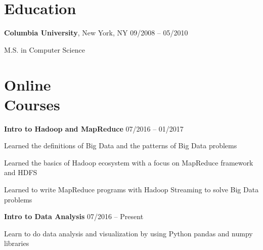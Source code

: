 \documentclass[margin,line]{resume}
\begin{document}
\begin{resume}
    \section{\myheadingstyle Education}

    \textbf{Columbia University}, New York, NY \hfill 09/2008 -- 05/2010 \vspace{-3mm}\\\vspace{-1mm}%
      \begin{list2}
       \item M.S. in Computer Science
      \end{list2}
    \vspace{-1mm}
 
    \section{\myheadingstyle Online \\ Courses}

    \textbf{Intro to Hadoop and MapReduce} \hfill 07/2016 -- 01/2017 \vspace{-3mm}\\\vspace{-1mm}%
      \begin{list2}
       \item Learned the definitions of Big Data and the patterns of Big Data problems
       \item Learned the basics of Hadoop ecosystem with a focus on MapReduce framework and HDFS
       \item Learned to write MapReduce programs with Hadoop Streaming to solve Big Data problems
      \end{list2}
    \vspace{-2mm}

    \textbf{Intro to Data Analysis} \hfill 07/2016 -- Present \vspace{-3mm}\\\vspace{-1mm}%
      \begin{list2}
       \item Learn to do data analysis and visualization by using Python pandas and numpy libraries
      \end{list2}
    \vspace{-2mm}


\end{resume}
\end{document}
